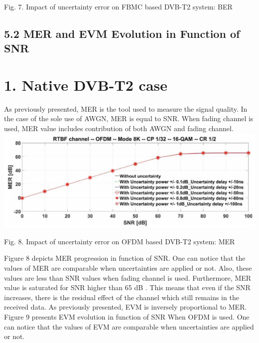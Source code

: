 \documentclass[10pt]{article}
\begin{document}
Fig. 7. Impact of uncertainty error on FBMC based DVB-T2 system: BER

\subsection*{5.2 MER and EVM Evolution in Function of SNR}
\section*{1. Native DVB-T2 case}
As previously presented, MER is the tool used to measure the signal quality. In the case of the sole use of AWGN, MER is equal to SNR. When fading channel is used, MER value includes contribution of both AWGN and fading channel.\\
\includegraphics[max width=\textwidth, center]{2024_11_15_3776bfa3c020725d7730g-4}

Fig. 8. Impact of uncertainty error on OFDM based DVB-T2 system: MER

Figure 8 depicts MER progression in function of SNR. One can notice that the values of MER are comparable when uncertainties are applied or not. Also, these values are less than SNR values when fading channel is used. Furthermore, MER value is saturated for SNR higher than 65 dB . This means that even if the SNR increases, there is the residual effect of the channel which still remains in the received data. As previously presented, EVM is inversely proportional to MER. Figure 9 presents EVM evolution in function of SNR When OFDM is used. One can notice that the values of EVM are comparable when uncertainties are applied or not.
\end{document}
